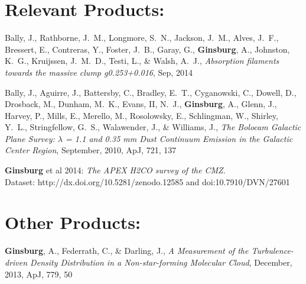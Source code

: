 \documentclass{article}
\newcommand\apj{{ApJ}}%
\newcommand{\myname}[1]{\textbf{{\normalsize #1}}}
\begin{document}
\section*{Relevant Products: }
\vspace{-1cm}
\begin{footnotesize}
%
%
\begin{thebibliography}{3}

{Bally}, J., {Rathborne}, J.~M., {Longmore}, S.~N., {Jackson}, J.~M., {Alves},
  J.~F., {Bressert}, E., {Contreras}, Y., {Foster}, J.~B., {Garay}, G.,
  {\myname{Ginsburg}}, A., {Johnston}, K.~G., {Kruijssen}, J.~M.~D., {Testi},
  L., \& {Walsh}, A.~J., \emph{Absorption filaments towards the massive clump
  g0.253+0.016}, Sep, 2014


{Bally}, J., {Aguirre}, J., {Battersby}, C., {Bradley}, E.~T., {Cyganowski},
  C., {Dowell}, D., {Drosback}, M., {Dunham}, M.~K., {Evans}, II, N.~J.,
  {\myname{Ginsburg}}, A., {Glenn}, J., {Harvey}, P., {Mills}, E., {Merello},
  M., {Rosolowsky}, E., {Schlingman}, W., {Shirley}, Y.~L., {Stringfellow},
  G.~S., {Walawender}, J., \& {Williams}, J., \emph{{The Bolocam Galactic Plane
  Survey: {$\lambda$} = 1.1 and 0.35 mm Dust Continuum Emission in the Galactic
  Center Region}}, September, 2010, \apj, 721, 137


    {\myname{Ginsburg}} et al 2014: \emph{The APEX H2CO survey of the CMZ.}\\
              Dataset: http://dx.doi.org/10.5281/zenodo.12585 and doi:10.7910/DVN/27601

\end{thebibliography}

\section*{Other Products: }
\vspace{-1cm}
\begin{thebibliography}{3}
{\myname{Ginsburg}}, A., {Federrath}, C., \& {Darling}, J., \emph{{A
  Measurement of the Turbulence-driven Density Distribution in a
  Non-star-forming Molecular Cloud}}, December, 2013{}, \apj, 779,
  50


\end{thebibliography}
\end{footnotesize}
\end{document}
